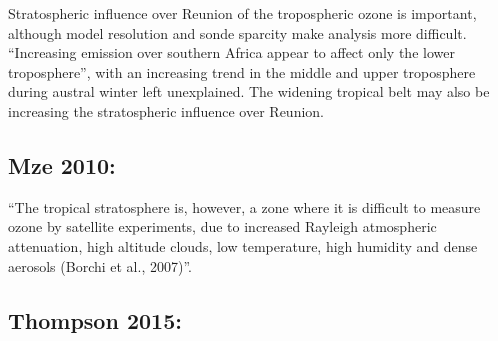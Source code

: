 \documentclass[11pt]{article} %
\begin{document}
    Stratospheric influence over Reunion of the tropospheric ozone is important, although model resolution and sonde sparcity make analysis more difficult.
    ``Increasing emission over southern Africa appear to affect only the lower troposphere'', with an increasing trend in the middle and upper troposphere during austral winter left unexplained.
    The widening tropical belt may also be increasing the stratospheric influence over Reunion.

  \subsection{Mze 2010:}
    \citet{Mze2010}
    ``The tropical stratosphere is, however, a zone where it is difficult to measure ozone by satellite experiments, due to increased Rayleigh atmospheric attenuation, high altitude clouds, low temperature, high humidity and dense aerosols (Borchi et al., 2007)''.

  \subsection{Thompson 2015: }
  
\printbibliography[heading=bibintoc]
\end{document}
